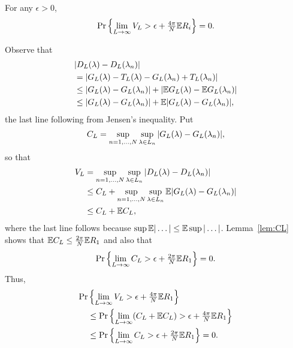 \documentclass[journal]{IEEEtran}
\begin{document}
\begin{lemma}\label{lem:supsupDLlambda} For any $\epsilon > 0$,
\[
{\operatorname{Pr}}\left\{ \lim_{L \rightarrow \infty} V_L > \epsilon + \tfrac{4\pi}{N}{\mathbb E} R_i \right\} = 0.
\]
\end{lemma}
\begin{IEEEproof}
Observe that
\begin{align*}
&{\vert D_L(\lambda) - D_L(\lambda_n) \vert} \\
&=  {\left\vert G_L(\lambda) - T_L(\lambda) - G_L(\lambda_n) + T_L(\lambda_n) \right\vert} \\
&\leq  {\left\vert G_L(\lambda) - G_L(\lambda_n) \right\vert} + {\left\vert {\mathbb E} G_L(\lambda) - {\mathbb E} G_L(\lambda_n) \right\vert} \\
&\leq {\left\vert G_L(\lambda) - G_L(\lambda_n)  \right\vert} + {\mathbb E} {\left\vert G_L(\lambda) - G_L(\lambda_n) \right\vert},
\end{align*}
the last line following from Jensen's inequality.  Put
\[
C_L = \sup_{n = 1,\dots,N}\sup_{\lambda \in L_n} {\left\vert G_L(\lambda) - G_L(\lambda_n)  \right\vert},
\]
so that
\begin{align*}
V_L &= \sup_{n = 1,\dots,N}\sup_{\lambda \in L_n}{\vert D_L(\lambda) - D_L(\lambda_n) \vert} \\
&\leq  C_L +  \sup_{n = 1,\dots,N}\sup_{\lambda \in L_n} {\mathbb E}{\left\vert G_L(\lambda) - G_L(\lambda_n)  \right\vert} \\
&\leq C_L + {\mathbb E} C_L,
\end{align*}
where the last line follows because $\sup {\mathbb E}\vert \dots\vert \leq {\mathbb E} \sup \vert \dots \vert$.  Lemma~\ref{lem:CL} shows that ${\mathbb E} C_L \leq \tfrac{2\pi}{N}{\mathbb E} R_1$ and also that
\[
{\operatorname{Pr}}\left\{ \lim_{L \rightarrow \infty} C_L > \epsilon + \tfrac{2\pi}{N}{\mathbb E} R_1 \right\} = 0.
\]
Thus,
\begin{align*}
{\operatorname{Pr}}&\left\{ \lim_{L \rightarrow \infty} V_L > \epsilon + \tfrac{4\pi}{N}{\mathbb E} R_1 \right\} \\
&\leq {\operatorname{Pr}}\left\{ \lim_{L \rightarrow \infty} (C_L + {\mathbb E} C_L) > \epsilon + \tfrac{4\pi}{N}{\mathbb E} R_1 \right\} \\
&\leq {\operatorname{Pr}}\left\{ \lim_{L \rightarrow \infty} C_L > \epsilon + \tfrac{2\pi}{N}{\mathbb E} R_1 \right\} = 0.
\end{align*}
\end{IEEEproof}
\end{document}
